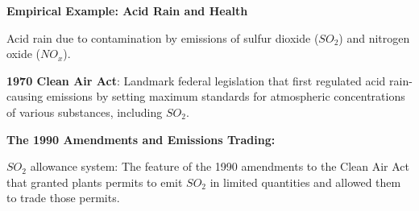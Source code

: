\documentclass[landscape]{slides}
\begin{document}
\begin{slide}

\end{slide}


%
%
%


\begin{slide}
\begin{center}
{\bf Empirical Example: Acid Rain and Health}
\end{center}
Acid rain due to contamination by emissions of sulfur dioxide ($SO_2$) and nitrogen oxide ($NO_x$).

{\bf 1970 Clean Air Act}:
Landmark federal legislation that first regulated acid rain-causing emissions by setting maximum standards for atmospheric concentrations of various substances, including $SO_2$.

{\bf The 1990 Amendments and Emissions Trading:}

$SO_2$ allowance system:
The feature of the 1990 amendments to the Clean Air Act that granted plants permits to emit $SO_2$ in limited quantities and allowed them to trade those permits.
\end{slide}
\end{document}
